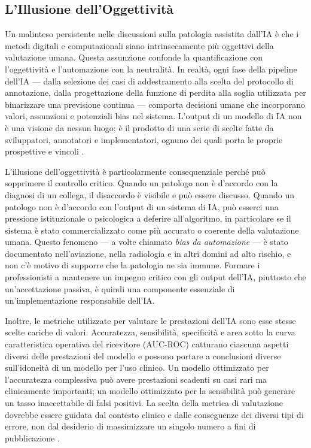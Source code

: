 \subsection{L'Illusione dell'Oggettività}

Un malinteso persistente nelle discussioni sulla patologia assistita dall'IA è che i metodi digitali e computazionali siano intrinsecamente più oggettivi della valutazione umana. Questa assunzione confonde la quantificazione con l'oggettività e l'automazione con la neutralità. In realtà, ogni fase della pipeline dell'IA — dalla selezione dei casi di addestramento alla scelta del protocollo di annotazione, dalla progettazione della funzione di perdita alla soglia utilizzata per binarizzare una previsione continua — comporta decisioni umane che incorporano valori, assunzioni e potenziali bias nel sistema. L'output di un modello di IA non è una visione da nessun luogo; è il prodotto di una serie di scelte fatte da sviluppatori, annotatori e implementatori, ognuno dei quali porta le proprie prospettive e vincoli \cite{hanna2024}.

L'illusione dell'oggettività è particolarmente consequenziale perché può sopprimere il controllo critico. Quando un patologo non è d'accordo con la diagnosi di un collega, il disaccordo è visibile e può essere discusso. Quando un patologo non è d'accordo con l'output di un sistema di IA, può esserci una pressione istituzionale o psicologica a deferire all'algoritmo, in particolare se il sistema è stato commercializzato come più accurato o coerente della valutazione umana. Questo fenomeno — a volte chiamato \emph{bias da automazione} — è stato documentato nell'aviazione, nella radiologia e in altri domini ad alto rischio, e non c'è motivo di supporre che la patologia ne sia immune. Formare i professionisti a mantenere un impegno critico con gli output dell'IA, piuttosto che un'accettazione passiva, è quindi una componente essenziale di un'implementazione responsabile dell'IA.

Inoltre, le metriche utilizzate per valutare le prestazioni dell'IA sono esse stesse scelte cariche di valori. Accuratezza, sensibilità, specificità e area sotto la curva caratteristica operativa del ricevitore (AUC-ROC) catturano ciascuna aspetti diversi delle prestazioni del modello e possono portare a conclusioni diverse sull'idoneità di un modello per l'uso clinico. Un modello ottimizzato per l'accuratezza complessiva può avere prestazioni scadenti su casi rari ma clinicamente importanti; un modello ottimizzato per la sensibilità può generare un tasso inaccettabile di falsi positivi. La scelta della metrica di valutazione dovrebbe essere guidata dal contesto clinico e dalle conseguenze dei diversi tipi di errore, non dal desiderio di massimizzare un singolo numero a fini di pubblicazione \cite{bankhead2022}.

